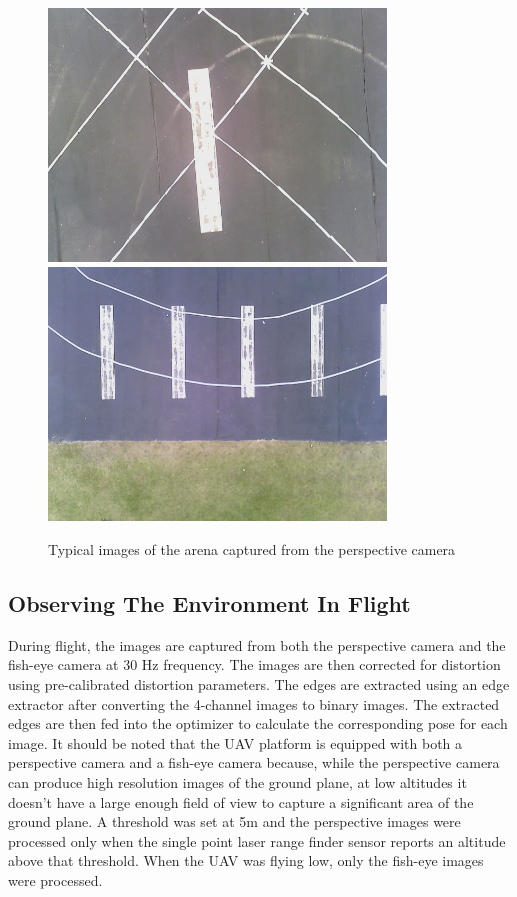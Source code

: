 \documentclass[12pt,a4paper]{report}
\begin{document}
\begin{figure}
	\centering
	\includegraphics[width=0.80\textwidth,clip=true,trim=17 50 5 17]{images/kentland1.jpg}
    \includegraphics[width=0.80\textwidth,clip=true,trim=17 50 5 17]{images/kentland2.jpg}
	\caption{Typical images of the arena captured from the perspective camera\label{arenaImagesPerspective}}
\end{figure}

\subsection{Observing The Environment In Flight}
During flight, the images are captured from both the perspective camera and the fish-eye camera at 30 Hz frequency. The images are then corrected for distortion using pre-calibrated distortion parameters. The edges are extracted using an edge extractor after converting the 4-channel images to binary images. The extracted edges are then fed into the optimizer to calculate the corresponding pose for each image. It should be noted that the UAV platform is equipped with both a perspective camera and a fish-eye camera because, while the perspective camera can produce high resolution images of the ground plane, at low altitudes it doesn't have a large enough field of view to capture a significant area of the ground plane. A threshold was set at 5m and the perspective images were processed only when the single point laser range finder sensor reports an altitude above that threshold. When the UAV was flying low, only the fish-eye images were processed. 
\end{document}
